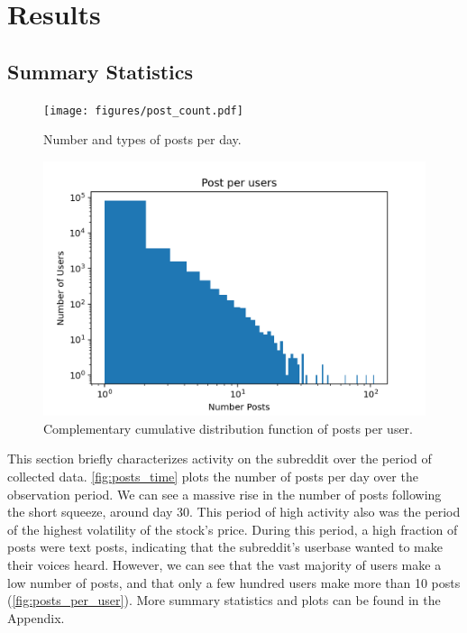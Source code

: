 \documentclass[noacm,sigconf,authorversion]{acmart}
\begin{document}
\section{Results}

\subsection{Summary Statistics}
\label{sec:summary_stats}

\begin{figure}[h!]       
    \texttt{[image: figures/post\_count.pdf]}
    \caption{Number and types of posts per day.}
    \label{fig:posts_time}
\end{figure}

\begin{figure}[h!]       
    \includegraphics[width=0.9\linewidth]{figures/posts_per_user.png}
    \caption{Complementary cumulative distribution function of posts per user.}
    \label{fig:posts_per_user}
\end{figure}

This section briefly characterizes activity on the subreddit over the period of collected data.
\autoref{fig:posts_time} plots the number of posts per day over the observation period. We can see a massive rise in the 
number of posts following the short squeeze, around day 30.
This period of high activity also was the period of the highest volatility of the stock's price.
During this period, a high fraction of posts were text posts, indicating that the subreddit's userbase wanted to make their 
voices heard.
However, we can see that the vast majority of users make a low number of posts, and that only a few hundred users make more 
than 10 posts (\autoref{fig:posts_per_user}). More summary statistics and plots can be found in the Appendix.
\end{document}

